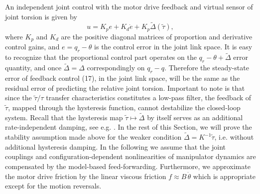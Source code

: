 \documentclass[a4paper, 10pt, conference]{ieeeconf}
\begin{document}
An independent joint control with the motor drive feedback and
virtual sensor of joint torsion is  given by
\begin{equation}\label{9}
u = K_{p}e + K_{d}\dot{e} + K_{p} \tilde{\Delta}(\tilde{\tau}),
\end{equation}
where $K_{p}$ and $K_{d}$ are the positive diagonal matrices of
proportion and derivative control gains, and $e = q_{r} - \theta$
is the control error in the joint link space. It is easy to
recognize that the proportional control part operates on the
$q_{r} - \theta + \tilde{\Delta}$ error quantity, and once
$\tilde{\Delta} = \Delta$ correspondingly on $q_{r} - q$.
Therefore the steady-state error of feedback control (17), in the
joint link space, will be the same as the residual error of
predicting the relative joint torsion. Important to note is that
since the $\tilde{\tau} / \tau$ transfer characteristics
constitutes a low-pass filter, the feedback of $\tilde{\tau}$,
mapped through the hysteresis function, cannot destabilize the
closed-loop system. Recall that the hysteresis map $\tilde{\tau}
\mapsto \tilde{\Delta}$ by itself serves as an additional
rate-independent damping, see e.g. \cite{Lazan68}. In the rest of
this Section, we will prove the stability assumption made above
for the weaker condition $\tilde{\Delta} = K^{-1} \tilde{\tau}$,
i.e. without additional hysteresis damping. In the following we
assume that the joint couplings and configuration-dependent
nonlinearities of manipulator dynamics are compensated by the
model-based feed-forwarding. Furthermore, we approximate the motor
drive friction by the linear viscous friction $f \approx B \,
\dot{\theta }$ which is appropriate except for the motion
reversals.
\end{document}
